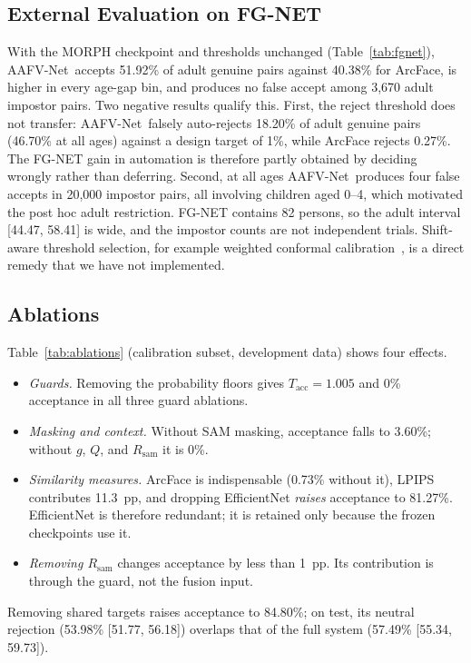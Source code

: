 \documentclass[journal]{IEEEtran}
\newcommand{\sys}{AAFV-Net}
\begin{document}


\subsection{External Evaluation on FG-NET}
\label{sec:fgnet}

With the MORPH checkpoint and thresholds unchanged (Table~\ref{tab:fgnet}), \sys\ accepts 51.92\% of adult genuine pairs against 40.38\% for ArcFace, is higher in every age-gap bin, and produces no false accept among 3,670 adult impostor pairs. Two negative results qualify this. First, the reject threshold does not transfer: \sys\ falsely auto-rejects 18.20\% of adult genuine pairs (46.70\% at all ages) against a design target of 1\%, while ArcFace rejects 0.27\%. The FG-NET gain in automation is therefore partly obtained by deciding wrongly rather than deferring. Second, at all ages \sys\ produces four false accepts in 20,000 impostor pairs, all involving children aged 0--4, which motivated the post hoc adult restriction. FG-NET contains 82 persons, so the adult interval [44.47, 58.41] is wide, and the impostor counts are not independent trials. Shift-aware threshold selection, for example weighted conformal calibration~\cite{tibshirani2019covshift}, is a direct remedy that we have not implemented.

\subsection{Ablations}
\label{sec:ablation}

Table~\ref{tab:ablations} (calibration subset, development data) shows four effects.
\begin{itemize}
\item \emph{Guards.} Removing the probability floors gives $T_{\text{acc}}=1.005$ and 0\% acceptance in all three guard ablations.
\item \emph{Masking and context.} Without SAM masking, acceptance falls to 3.60\%; without $g$, $Q$, and $R_{\text{sam}}$ it is 0\%.
\item \emph{Similarity measures.} ArcFace is indispensable (0.73\% without it), LPIPS contributes 11.3~pp, and dropping EfficientNet \emph{raises} acceptance to 81.27\%. EfficientNet is therefore redundant; it is retained only because the frozen checkpoints use it.
\item \emph{Removing $R_{\text{sam}}$} changes acceptance by less than 1~pp. Its contribution is through the guard, not the fusion input.
\end{itemize}
Removing shared targets raises acceptance to 84.80\%; on test, its neutral rejection (53.98\% [51.77, 56.18]) overlaps that of the full system (57.49\% [55.34, 59.73]).
\end{document}

